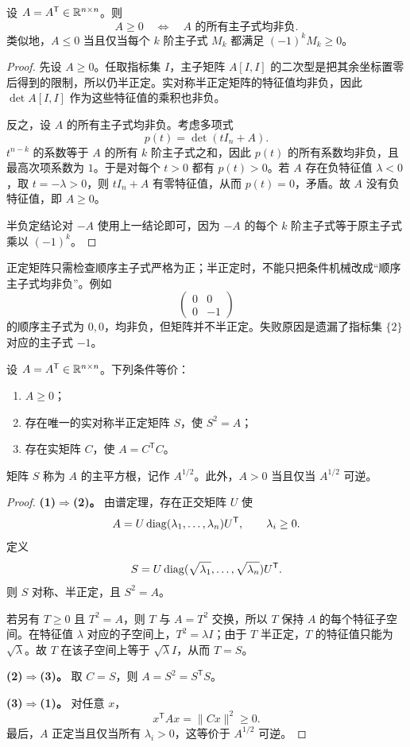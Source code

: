 \begin{theorem}[半正定与主子式判据]
设 $A=A^{\mathsf T}\in\mathbb{R}^{n\times n}$。则
\[
A\ge0
\quad\Longleftrightarrow\quad
A\text{ 的所有主子式均非负}.
\]
类似地，$A\le0$ 当且仅当每个 $k$ 阶主子式 $M_k$ 都满足 $(-1)^kM_k\ge0$。
\end{theorem}
\begin{proof}
先设 $A\ge0$。任取指标集 $I$，主子矩阵 $A[I,I]$ 的二次型是把其余坐标置零后得到的限制，所以仍半正定。实对称半正定矩阵的特征值均非负，因此 $\det A[I,I]$ 作为这些特征值的乘积也非负。

反之，设 $A$ 的所有主子式均非负。考虑多项式
\[
p(t)=\det(tI_n+A).
\]
$t^{n-k}$ 的系数等于 $A$ 的所有 $k$ 阶主子式之和，因此 $p(t)$ 的所有系数均非负，且最高次项系数为 $1$。于是对每个 $t>0$ 都有 $p(t)>0$。若 $A$ 存在负特征值 $\lambda<0$，取 $t=-\lambda>0$，则 $tI_n+A$ 有零特征值，从而 $p(t)=0$，矛盾。故 $A$ 没有负特征值，即 $A\ge0$。

半负定结论对 $-A$ 使用上一结论即可，因为 $-A$ 的每个 $k$ 阶主子式等于原主子式乘以 $(-1)^k$。
\end{proof}

\begin{pitfall}[半正定判据必须检查所有主子式]
正定矩阵只需检查顺序主子式严格为正；半正定时，不能只把条件机械改成“顺序主子式均非负”。例如
\[
\begin{pmatrix}0&0\\0&-1\end{pmatrix}
\]
的顺序主子式为 $0,0$，均非负，但矩阵并不半正定。失败原因是遗漏了指标集 $\{2\}$ 对应的主子式 $-1$。
\end{pitfall}

\begin{theorem}[半正定矩阵的平方根与分解]
设 $A=A^{\mathsf T}\in\mathbb{R}^{n\times n}$。下列条件等价：
\begin{enumerate}
\item $A\ge0$；
\item 存在唯一的实对称半正定矩阵 $S$，使 $S^2=A$；
\item 存在实矩阵 $C$，使 $A=C^{\mathsf T}C$。
\end{enumerate}
矩阵 $S$ 称为 $A$ 的主平方根，记作 $A^{1/2}$。此外，$A>0$ 当且仅当 $A^{1/2}$ 可逆。
\end{theorem}
\begin{proof}
\textbf{(1)$\Longrightarrow$(2)。} 由谱定理，存在正交矩阵 $U$ 使
\[
A=U\operatorname{diag}(\lambda_1,\ldots,\lambda_n)U^{\mathsf T},
\qquad \lambda_i\ge0.
\]
定义
\[
S=U\operatorname{diag}(\sqrt{\lambda_1},\ldots,\sqrt{\lambda_n})U^{\mathsf T}.
\]
则 $S$ 对称、半正定，且 $S^2=A$。

若另有 $T\ge0$ 且 $T^2=A$，则 $T$ 与 $A=T^2$ 交换，所以 $T$ 保持 $A$ 的每个特征子空间。在特征值 $\lambda$ 对应的子空间上，$T^2=\lambda I$；由于 $T$ 半正定，$T$ 的特征值只能为 $\sqrt\lambda$。故 $T$ 在该子空间上等于 $\sqrt\lambda I$，从而 $T=S$。

\textbf{(2)$\Longrightarrow$(3)。} 取 $C=S$，则 $A=S^2=S^{\mathsf T}S$。

\textbf{(3)$\Longrightarrow$(1)。} 对任意 $x$，
\[
x^{\mathsf T}Ax=\lVert Cx\rVert^2\ge0.
\]
最后，$A$ 正定当且仅当所有 $\lambda_i>0$，这等价于 $A^{1/2}$ 可逆。
\end{proof}

